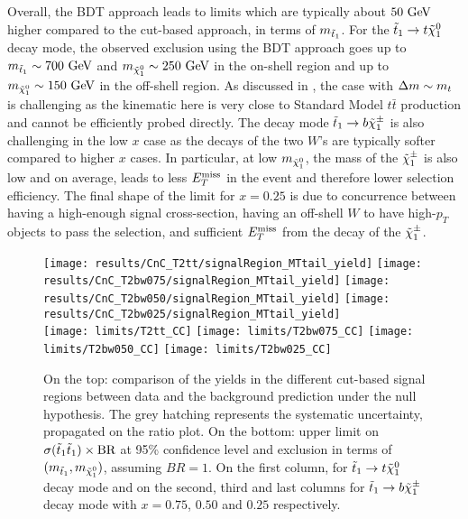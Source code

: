     Overall, the BDT approach leads to limits which are typically about $50~\text{GeV}$ higher
    compared to the cut-based approach, in terms of $m_{\tilde{t}_1}$. For the $\tilde{t}_1
    \rightarrow t \tilde{\chi}_1^0$ decay mode, the observed exclusion using the BDT approach
    goes up to $m_{\tilde{t}_1} \sim 700~\text{GeV}$ and $m_{\tilde{\chi}_1^0} \sim 250~\text{GeV}$ in the
    on-shell region and up to $m_{\tilde{\chi}_1^0} \sim 150~\text{GeV}$ in the off-shell region.
    As discussed in , the case with $\Delta m \sim
    m_{t}$ is challenging as the kinematic here is very close to Standard Model $t\bar{t}$
    production and cannot be efficiently probed directly.  The
    decay mode $\tilde{t}_1 \rightarrow b \tilde{\chi}_1^\pm$ is also challenging in the low $x$ case
    as the decays of the two $W$'s are typically softer compared to higher $x$ cases. In
    particular, at low $m_{\tilde{\chi}_1^0}$, the mass of the $\tilde{\chi}_1^\pm$ is also low and
    on average, leads to less $E_T^\text{miss}$ in the event and therefore lower selection efficiency. The final shape
    of the limit for $x = 0.25$ is due to concurrence between having a high-enough signal cross-section,
    having an off-shell $W$ to have high-$p_T$ objects to pass the selection, and
    sufficient $E_T^\text{miss}$ from the decay of the $\tilde{\chi}_1^\pm$.

    \begin{landscape}
        \thispagestyle{empty}
        \vspace*{1cm}
    \begin{figure}[h!]
        \centering
        \texttt{[image: results/CnC\_T2tt/signalRegion\_MTtail\_yield]}
        \texttt{[image: results/CnC\_T2bw075/signalRegion\_MTtail\_yield]}
        \texttt{[image: results/CnC\_T2bw050/signalRegion\_MTtail\_yield]}
        \texttt{[image: results/CnC\_T2bw025/signalRegion\_MTtail\_yield]}\\
        \texttt{[image: limits/T2tt\_CC]}
        \texttt{[image: limits/T2bw075\_CC]}
        \texttt{[image: limits/T2bw050\_CC]}
        \texttt{[image: limits/T2bw025\_CC]}
        \caption{On the top: comparison of the yields in the different cut-based signal
        regions between data and the background prediction under the null hypothesis. The
        grey hatching represents the systematic uncertainty, propagated on the ratio plot.
        On the bottom: upper limit on $\sigma(\tilde{t}_1\tilde{t}_1) \times \text{BR}$ at 95\% confidence level and exclusion in terms of
        $(m_{\tilde{t}_1},m_{\tilde{\chi}_1^0})$, assuming
        $BR = 1$. On the first column, for $\tilde{t}_1 \rightarrow t \tilde{\chi}_1^0$ decay mode and on
        the second, third and last columns for $\tilde{t}_1 \rightarrow b \tilde{\chi}_1^\pm$ decay mode
        with $x=0.75$, $0.50$ and $0.25$ respectively.}
        \label{fig:resultsCnC}
    \end{figure}
    \end{landscape}

